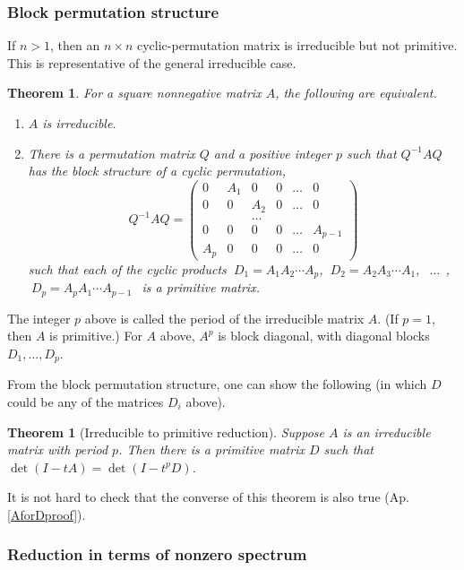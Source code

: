 \documentclass{amsart}
\newcommand{\si}{\index}
\newtheorem{thm}[equation]{Theorem}
\theoremstyle{definition}
\theoremstyle{definition}
\newcommand{\apr}{(Ap. \ref}
\numberwithin{equation}{subsection}
\begin{document}
\subsubsection{Block permutation structure}
If $n>1$, then an $n\times n$ cyclic-permutation matrix
is irreducible but  not primitive.
This is  representative of the
general irreducible case.

\begin{thm}  For a square nonnegative matrix $A$, the following are equivalent.
\begin{enumerate}
\item $A$ is irreducible.
\item There is a permutation matrix $Q$
and a positive integer $p$ such that $Q^{-1}AQ$
has the block structure of a cyclic permutation,
\[
Q^{-1} A Q =
\begin{pmatrix}
0 & A_1 & 0 & 0 &\dots & 0 \\
0 & 0 & A_2 & 0 &\dots & 0 \\
&   &\dots   &&& \\
0 & 0 & 0 & 0 &\dots & A_{p-1}  \\
A_{p} & 0 & 0 & 0 &\dots & 0
\end{pmatrix}
\]
such that each of the cyclic products  $\ D_1=A_1A_2\cdots A_p$,
$\ D_2= A_2A_3\cdots A_1$, $\ \ \dots \ \ $,
$\ D_p= A_pA_1\cdots A_{p-1} \ \ $
is a  primitive matrix.
\end{enumerate}
\end{thm}
The integer $p$ above is called the period of
the irreducible matrix $A$. (If $p=1$,
then $A$ is primitive.) For $A$ above,  $A^p$ is block
diagonal, with diagonal blocks $D_1, \dots , D_p$.

From the block permutation structure, one can show
the following (in which  $D$ could be any of the
matrices $D_i$ above).

\begin{thm}[Irreducible to primitive reduction]
Suppose $A$ is an irreducible matrix with period
$p$. Then there is a primitive matrix $D$ such that
$\det (I-tA) =\det (I-t^pD)$.
\end{thm}
It is not hard to check that the  converse of this theorem is also true
\apr{AforDproof}).

\subsubsection{Reduction in terms of nonzero\si{nonzero spectrum} spectrum}
\end{document}
